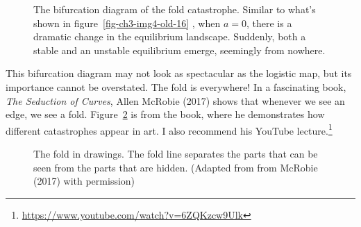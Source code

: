 \documentclass[
  a4paper,
  DIV=11,
  numbers=noendperiod,
  oneside]{scrreprt}
\begin{document}
\begin{figure}


\caption{\label{fig-ch3-img5-old-17}The bifurcation diagram of the fold
catastrophe. Similar to what's shown in figure~\ref{fig-ch3-img4-old-16}
, when \(a=0\), there is a dramatic change in the equilibrium landscape.
Suddenly, both a stable and an unstable equilibrium emerge, seemingly
from nowhere.}

\end{figure}%

This bifurcation diagram may not look as spectacular as the logistic
map, but its importance cannot be overstated. The fold is everywhere! In
a fascinating book, \emph{The Seduction of Curves}, Allen McRobie (2017)
shows that whenever we see an edge, we see a fold.
Figure~\ref{fig-ch3-img6-old-18} is from the book, where he demonstrates
how different catastrophes appear in art. I also recommend his YouTube
lecture.\footnote{\url{https://www.youtube.com/watch?v=6ZQKzcw9Ulk}}

\begin{figure}


\caption{\label{fig-ch3-img6-old-18}The fold in drawings. The fold line
separates the parts that can be seen from the parts that are hidden.
(Adapted from from McRobie (2017) with permission)}

\end{figure}%
\end{document}
